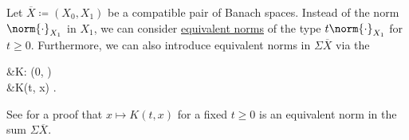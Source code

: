 \begin{definition}\label{def:k_functional}
  Let \( \overline{X} \coloneqq ( X_0, X_1 ) \) be a compatible pair of Banach spaces. Instead of the norm \( \norm{\cdot}_{X_1} \) in \( X_1 \), we can consider \hyperref[def:equivalent_metrics]{equivalent norms} of the type \( t\norm{\cdot}_{X_1} \) for \( t \geq 0 \). Furthermore, we can also introduce equivalent norms in \( \Sigma \overline{X} \) via the 
  \begin{alignedeq}\label{eq:def:k_functional}
    &K: (0, \infty)  \\
    &K(t, x) \coloneqq \inf {}.
  \end{alignedeq}

  See  for a proof that \( x \mapsto K(t, x) \) for a fixed \( t \geq 0 \) is an equivalent norm in the sum \( \Sigma \overline{X} \).
\end{definition}

